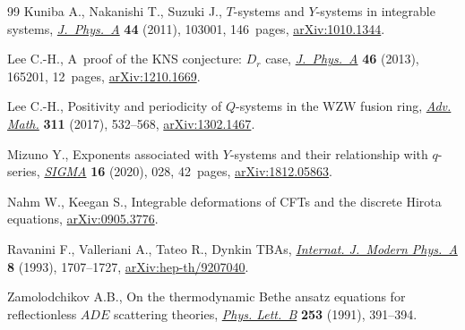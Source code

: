 \documentclass[10pt,a4paper]{amsart}
\numberwithin{equation}{section}
\begin{document}
\begin{thebibliography}{99}
Kuniba A., Nakanishi T., Suzuki J., {$T$}-systems and {$Y$}-systems in
 integrable systems, \href{https://doi.org/10.1088/1751-8113/44/10/103001}{\textit{J.~Phys.~A}} \textbf{44} (2011), 103001,
 146~pages, \href{https://arxiv.org/abs/1010.1344}{arXiv:1010.1344}.

Lee C.-H., A~proof of the {KNS} conjecture: {$D_r$} case, \href{https://doi.org/10.1088/1751-8113/46/16/165201}{\textit{J.~Phys.~A}}
 \textbf{46} (2013), 165201, 12~pages, \href{https://arxiv.org/abs/1210.1669}{arXiv:1210.1669}.

Lee C.-H., Positivity and periodicity of {$Q$}-systems in the {WZW} fusion ring,
 \href{https://doi.org/10.1016/j.aim.2017.02.031}{\textit{Adv. Math.}} \textbf{311} (2017), 532--568, \href{https://arxiv.org/abs/1302.1467}{arXiv:1302.1467}.

Mizuno Y., Exponents associated with {$Y$}-systems and their relationship with
 {$q$}-series, \href{https://doi.org/10.3842/SIGMA.2020.028}{\textit{SIGMA}} \textbf{16} (2020), 028, 42~pages,
 \href{https://arxiv.org/abs/1812.05863}{arXiv:1812.05863}.

Nahm W., Keegan S., Integrable deformations of {CFT}s and the discrete {H}irota
 equations, \href{https://arxiv.org/abs/0905.3776}{arXiv:0905.3776}.

Ravanini F., Valleriani A., Tateo R., Dynkin {TBA}s, \href{https://doi.org/10.1142/S0217751X93000709}{\textit{Internat.
 J.~Modern Phys.~A}} \textbf{8} (1993), 1707--1727, \href{https://arxiv.org/abs/hep-th/9207040}{arXiv:hep-th/9207040}.

Zamolodchikov A.B., On the thermodynamic {B}ethe ansatz equations for
 reflectionless {$ADE$} scattering theories, \href{https://doi.org/10.1016/0370-2693(91)91737-G}{\textit{Phys. Lett.~B}}
 \textbf{253} (1991), 391--394.

\end{thebibliography}
\end{document}
